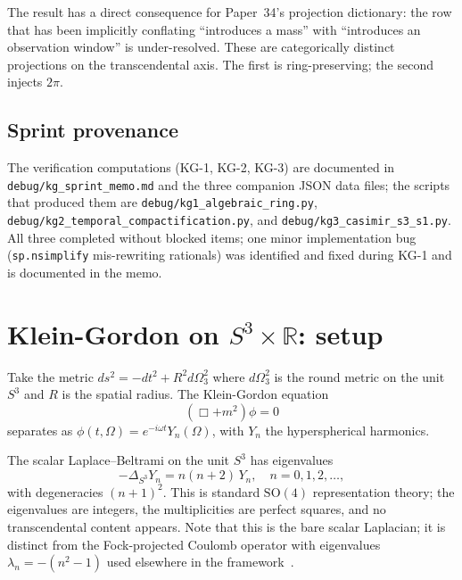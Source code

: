 \documentclass[11pt]{article}
\begin{document}
The result has a direct consequence for Paper~34's projection
dictionary: the row that has been implicitly conflating ``introduces a
mass'' with ``introduces an observation window'' is under-resolved.
These are categorically distinct projections on the transcendental
axis.  The first is ring-preserving; the second injects $2\pi$.

\subsection*{Sprint provenance}
The verification computations (KG-1, KG-2, KG-3) are documented in
\texttt{debug/kg\_sprint\_memo.md} and the three companion JSON data
files; the scripts that produced them are
\texttt{debug/kg1\_algebraic\_ring.py},
\texttt{debug/kg2\_temporal\_compactification.py}, and
\texttt{debug/kg3\_casimir\_s3\_s1.py}.  All three completed without
blocked items; one minor implementation bug (\texttt{sp.nsimplify}
mis-rewriting rationals) was identified and fixed during KG-1 and is
documented in the memo.

\section{Klein-Gordon on $S^3 \times \mathbb{R}$: setup}
\label{sec:setup}

Take the metric $ds^2 = -dt^2 + R^2 d\Omega^2_3$ where $d\Omega^2_3$
is the round metric on the unit $S^3$ and $R$ is the spatial radius.
The Klein-Gordon equation
\begin{equation}
\label{eq:kg}
(\Box + m^2)\phi = 0
\end{equation}
separates as $\phi(t, \Omega) = e^{-i\omega t} Y_n(\Omega)$, with
$Y_n$ the hyperspherical harmonics.

The scalar Laplace--Beltrami on the unit $S^3$ has eigenvalues
\begin{equation}
\label{eq:LB_eigvals}
-\Delta_{S^3} Y_n = n(n+2) \, Y_n,
\quad n = 0, 1, 2, \ldots,
\end{equation}
with degeneracies $(n+1)^2$.  This is standard $\mathrm{SO}(4)$
representation theory; the eigenvalues are integers, the multiplicities
are perfect squares, and no transcendental content appears.  Note that
this is the bare scalar Laplacian; it is distinct from the Fock-projected
Coulomb operator with eigenvalues $\lambda_n = -(n^2 - 1)$ used elsewhere
in the framework~\cite{paper7}.
\end{document}
